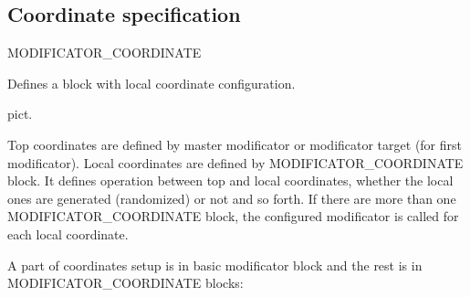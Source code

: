 \documentclass[11pt]{article}
\begin{document}
\subsection{Coordinate specification}
MODIFICATOR\_COORDINATE

Defines a block with local coordinate configuration.

pict.

Top coordinates are defined by master modificator or modificator target
(for first modificator). Local coordinates are defined by MODIFICATOR\_COORDINATE
block. It defines operation between top and local coordinates, whether the local
ones are generated (randomized) or not and so forth. If there are more than one
MODIFICATOR\_COORDINATE block, the configured modificator is called for each local
coordinate.

A part of coordinates setup is in basic modificator block and the rest 
is in MODIFICATOR\_COORDINATE blocks:
\end{document}
